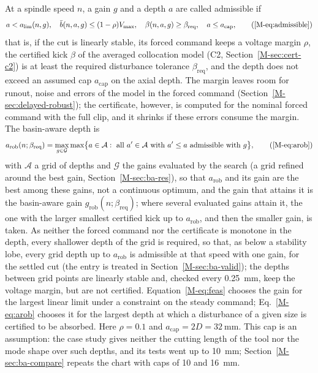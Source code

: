At a spindle speed $n$, a gain $g$ and a depth $a$ are called admissible if
\begin{equation*}
  a<\alim(n,g),\quad \bar b(n,a,g)\le(1-\rho)\Vmax,\quad \beta(n,a,g)\ge\beta_{\mathrm{req}},\quad a\le a_{\mathrm{cap}},
  \tag{\ref{M-eq:admissible}}
\end{equation*}
that is, if the cut is linearly stable, its forced command keeps a voltage margin $\rho$, the certified kick $\beta$ of the averaged collocation model (C2, Section~\ref{M-sec:cert-c2}) is at least the required disturbance tolerance $\beta_{\mathrm{req}}$, and the depth does not exceed an assumed cap $a_{\mathrm{cap}}$ on the axial depth. The margin leaves room for runout, noise and errors of the model in the forced command (Section~\ref{M-sec:delayed-robust}); the certificate, however, is computed for the nominal forced command with the full clip, and it shrinks if these errors consume the margin. The basin-aware depth is
\begin{equation*}
  a_{\mathrm{rob}}(n;\beta_{\mathrm{req}})=\max_{g\in\mathcal G}\max\bigl\{a\in\mathcal A:\text{ all }a'\in\mathcal A\text{ with }a'\le a\text{ admissible with }g\bigr\},
  \tag{\ref{M-eq:arob}}
\end{equation*}
with $\mathcal A$ a grid of depths and $\mathcal G$ the gains evaluated by the search (a grid refined around the best gain, Section~\ref{M-sec:ba-res}), so that $a_{\mathrm{rob}}$ and its gain are the best among these gains, not a continuous optimum, and the gain that attains it is the basin-aware gain $g_{\mathrm{rob}}(n;\beta_{\mathrm{req}})$; where several evaluated gains attain it, the one with the larger smallest certified kick up to $a_{\mathrm{rob}}$, and then the smaller gain, is taken. As neither the forced command nor the certificate is monotone in the depth, every shallower depth of the grid is required, so that, as below a stability lobe, every grid depth up to $a_{\mathrm{rob}}$ is admissible at that speed with one gain, for the settled cut (the entry is treated in Section~\ref{M-sec:ba-valid}); the depths between grid points are linearly stable and, checked every \SI{0.25}{\milli\metre}, keep the voltage margin, but are not certified. Equation~\eqref{M-eq:feas} chooses the gain for the largest linear limit under a constraint on the steady command; Eq.~\eqref{M-eq:arob} chooses it for the largest depth at which a disturbance of a given size is certified to be absorbed. Here $\rho=0.1$ and $a_{\mathrm{cap}}=2D=\SI{32}{\milli\metre}$. This cap is an assumption: the case study gives neither the cutting length of the tool nor the mode shape over such depths, and its tests went up to \SI{10}{\milli\metre}; Section~\ref{M-sec:ba-compare} repeats the chart with caps of 10 and \SI{16}{\milli\metre}.

